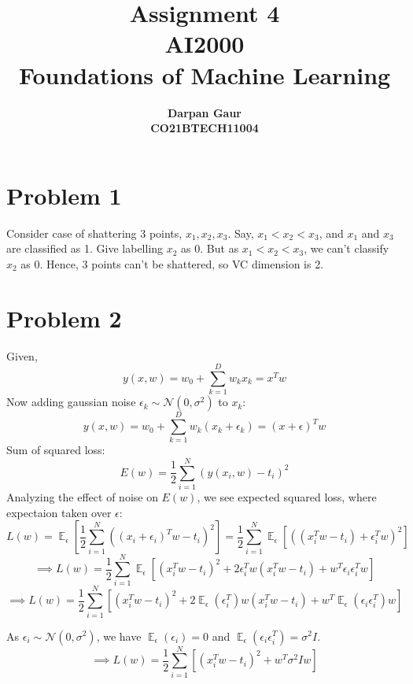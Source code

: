 \documentclass[12pt]{article}
\title{
    \textbf{Assignment 4} \\ 
    \textbf{AI2000} \\
    \textbf{Foundations of Machine Learning}
}
\author{
    \textbf{Darpan Gaur} \\
    \textbf{CO21BTECH11004}
}
\date{}
\DeclareMathOperator{\E}{\mathbb{E}}
\begin{document}
\maketitle

\hrulefill

\section*{Problem 1}
Consider case of shattering 3 points, $x_1, x_2, x_3$.
Say, $x_1 < x_2 < x_3$, and $x_1$ and $x_3$ are classified as 1.
Give labelling $x_2$ as 0. But as $x_1 < x_2 < x_3$, we can't classify $x_2$ as 0.
Hence, 3 points can't be shattered, so VC dimension is 2.

\section*{Problem 2}
Given, 
\begin{equation*}
    y(x, w) = w_0 + \sum_{k=1}^{D} w_k x_k = x^T w
\end{equation*}
Now adding gaussian noise $\epsilon_k \sim \mathcal{N}(0, \sigma^2)$ to $x_k$:
\begin{equation*}
    y(x, w) = w_0 + \sum_{k=1}^{D} w_k (x_k + \epsilon_k) = (x + \epsilon)^T w
\end{equation*}
Sum of squared loss:
\begin{equation*}
    E(w) = \frac{1}{2} \sum_{i=1}^{N} (y(x_i, w) - t_i)^2
\end{equation*}
Analyzing the effect of noise on $E(w)$, we see expected squared loss, where expectaion taken over $\epsilon$:
\begin{equation*}
    L(w) = \E_{\epsilon} [\frac{1}{2} \sum_{i=1}^{N} ((x_i + \epsilon_i)^T w - t_i)^2] = \frac{1}{2} \sum_{i=1}^{N} \E_{\epsilon} [((x_i^T w - t_i) + \epsilon_i^T w)^2]
\end{equation*}
\begin{equation*}
    \implies
    L(w) = \frac{1}{2} \sum_{i=1}^{N} \E_{\epsilon} [(x_i^T w - t_i)^2 + 2 \epsilon_i^T w (x_i^T w - t_i) + w^T \epsilon_i \epsilon_i^T w]
\end{equation*}
\begin{equation*}
    \implies
    L(w) = \frac{1}{2} \sum_{i=1}^{N} [(x_i^T w - t_i)^2 + 2 \E_{\epsilon} (\epsilon_i^T) w (x_i^T w - t_i) + w^T \E_{\epsilon} (\epsilon_i \epsilon_i^T) w]
\end{equation*}

As $\epsilon_i \sim \mathcal{N}(0, \sigma^2)$, we have $\E_{\epsilon} (\epsilon_i) = 0$ and $\E_{\epsilon} (\epsilon_i \epsilon_i^T) = \sigma^2 I$.
\begin{equation*}
    \implies
    L(w) = \frac{1}{2} \sum_{i=1}^{N} [(x_i^T w - t_i)^2 + w^T \sigma^2 I w]
\end{equation*}
\end{document}
